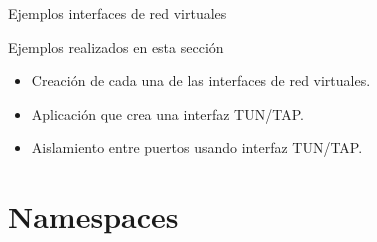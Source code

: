 \documentclass[aspectratio=169,xcolor=dvipsnames]{beamer}
\begin{document}
	\begin{frame}{Ejemplos interfaces de red virtuales}
	    \begin{alertblock}{Ejemplos realizados en esta sección}
	        \begin{itemize}
	            \item Creación de cada una de las interfaces de red virtuales.
	            \item Aplicación que crea una interfaz TUN/TAP.
	            \item Aislamiento entre puertos usando interfaz TUN/TAP.
	        \end{itemize}
	    \end{alertblock}
	\end{frame}
	
	
	\section{Namespaces}
	
\end{document}
